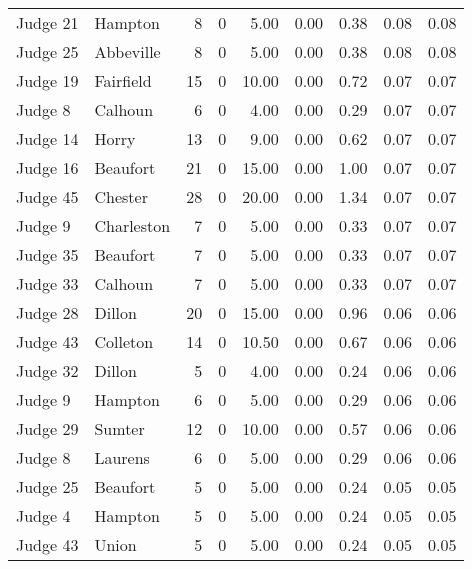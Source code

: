 \begin{tabular}{llrrrrrrr}
Judge 21 &      Hampton &     8 &      0 &  5.00 &       0.00 &      0.38 &         0.08 &      0.08 \\
Judge 25 &    Abbeville &     8 &      0 &  5.00 &       0.00 &      0.38 &         0.08 &      0.08 \\
Judge 19 &    Fairfield &    15 &      0 & 10.00 &       0.00 &      0.72 &         0.07 &      0.07 \\
 Judge 8 &      Calhoun &     6 &      0 &  4.00 &       0.00 &      0.29 &         0.07 &      0.07 \\
Judge 14 &        Horry &    13 &      0 &  9.00 &       0.00 &      0.62 &         0.07 &      0.07 \\
Judge 16 &     Beaufort &    21 &      0 & 15.00 &       0.00 &      1.00 &         0.07 &      0.07 \\
Judge 45 &      Chester &    28 &      0 & 20.00 &       0.00 &      1.34 &         0.07 &      0.07 \\
 Judge 9 &   Charleston &     7 &      0 &  5.00 &       0.00 &      0.33 &         0.07 &      0.07 \\
Judge 35 &     Beaufort &     7 &      0 &  5.00 &       0.00 &      0.33 &         0.07 &      0.07 \\
Judge 33 &      Calhoun &     7 &      0 &  5.00 &       0.00 &      0.33 &         0.07 &      0.07 \\
Judge 28 &       Dillon &    20 &      0 & 15.00 &       0.00 &      0.96 &         0.06 &      0.06 \\
Judge 43 &     Colleton &    14 &      0 & 10.50 &       0.00 &      0.67 &         0.06 &      0.06 \\
Judge 32 &       Dillon &     5 &      0 &  4.00 &       0.00 &      0.24 &         0.06 &      0.06 \\
 Judge 9 &      Hampton &     6 &      0 &  5.00 &       0.00 &      0.29 &         0.06 &      0.06 \\
Judge 29 &       Sumter &    12 &      0 & 10.00 &       0.00 &      0.57 &         0.06 &      0.06 \\
 Judge 8 &      Laurens &     6 &      0 &  5.00 &       0.00 &      0.29 &         0.06 &      0.06 \\
Judge 25 &     Beaufort &     5 &      0 &  5.00 &       0.00 &      0.24 &         0.05 &      0.05 \\
 Judge 4 &      Hampton &     5 &      0 &  5.00 &       0.00 &      0.24 &         0.05 &      0.05 \\
Judge 43 &        Union &     5 &      0 &  5.00 &       0.00 &      0.24 &         0.05 &      0.05 \\

\end{tabular}
